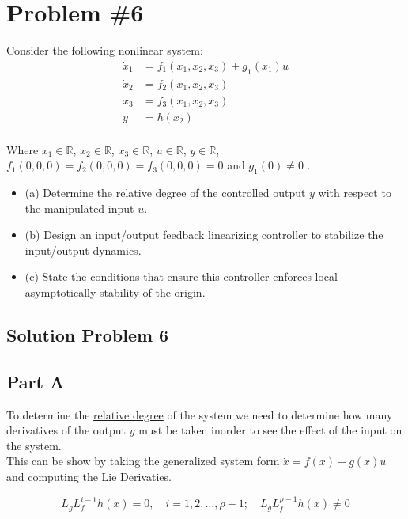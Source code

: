 \section*{Problem \#6}

Consider the following nonlinear system:
$$
\begin{aligned}
\dot{x}_{1} &=f_{1}\left(x_{1}, x_{2}, x_{3}\right)+g_{1}\left(x_{1}\right) u \\
\dot{x}_{2} &=f_{2}\left(x_{1}, x_{2}, x_{3}\right) \\
\dot{x}_{3} &=f_{3}\left(x_{1}, x_{2}, x_{3}\right) \\
y &=h\left(x_{2}\right) \\
\end{aligned}
$$

\noindent Where $x_{1} \in \mathbb{R}$, $x_{2} \in \mathbb{R}$, $x_{3} \in \mathbb{R}$, $u \in \mathbb{R}$, $y \in \mathbb{R}$, $f_{1}(0,0,0)=f_{2}(0,0,0)=f_{3}(0,0,0)=0$ and $g_{1}(0) \neq 0$ .

\begin{itemize}
  \item (a) Determine the relative degree of the controlled output $y$ with respect to the manipulated input $u$.
  \item (b) Design an input/output feedback linearizing controller to stabilize the input/output dynamics.
  \item (c) State the conditions that ensure this controller enforces local asymptotically stability of the origin.
\end{itemize}


\subsection*{Solution Problem 6}


\subsection*{Part A}
To determine the \underline{relative degree} of the system we need to determine how many derivatives of the output $y$ must be taken inorder to see the effect of the input on the system. \\

\noindent This can be show by taking the generalized system form $ \dot{x} = f(x) + g(x)u $ and computing the Lie Derivaties.

$$
L_{g} L_{f}^{i-1} h(x)=0, \quad i=1,2, \ldots, \rho-1 ; \quad L_{g} L_{f}^{\rho-1} h(x) \neq 0
$$

